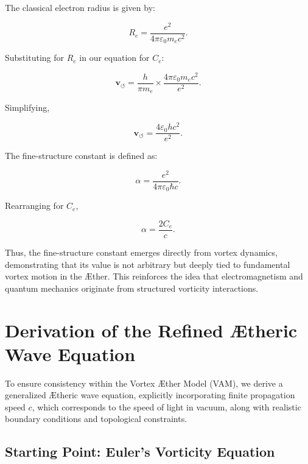 \documentclass[a4paper,12pt]{article}
\begin{document}
The classical electron radius is given by:

\begin{equation}
    R_e = \frac{e^2}{4 \pi \varepsilon_0 m_e c^2}.
\end{equation}

Substituting for $R_e$ in our equation for $C_e$:

\begin{equation}
    \mathbf{v}_{\scriptscriptstyle\boldsymbol{\circlearrowleft}} = \frac{h}{\pi m_e} \times \frac{4 \pi \varepsilon_0 m_e c^2}{e^2}.
\end{equation}

Simplifying,

\begin{equation}
    \mathbf{v}_{\scriptscriptstyle\boldsymbol{\circlearrowleft}} = \frac{4 \varepsilon_0 h c^2}{e^2}.
\end{equation}

The fine-structure constant is defined as:

\begin{equation}
    \alpha = \frac{e^2}{4 \pi \varepsilon_0 \hbar c}.
\end{equation}

Rearranging for $C_e$,

\begin{equation}
    \alpha = \frac{2 C_e}{c}.
\end{equation}

Thus, the fine-structure constant emerges directly from vortex dynamics, demonstrating that its value is not arbitrary but deeply tied to fundamental vortex motion in the Æther. This reinforces the idea that electromagnetism and quantum mechanics originate from structured vorticity interactions.
\label{appendix:alpha}


\section{Derivation of the Refined Ætheric Wave Equation}


To ensure consistency within the Vortex Æther Model (VAM), we derive a generalized Ætheric wave equation, explicitly incorporating finite propagation speed $c$, which corresponds to the speed of light in vacuum, along with realistic boundary conditions and topological constraints.


\subsection{Starting Point: Euler's Vorticity Equation}
\end{document}

